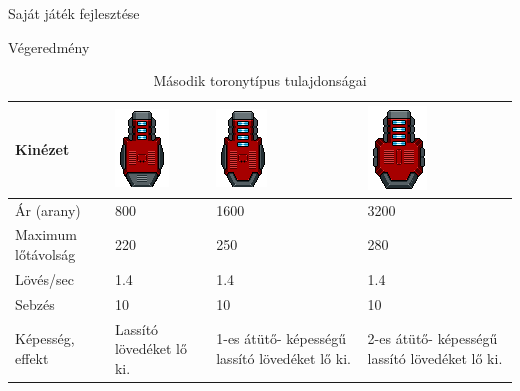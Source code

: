 \begin{MyChapter}{Saját játék fejlesztése}
\begin{MySection}{Végeredmény}
		\begin{table}[H]
			\centering
			\caption{Második toronytípus tulajdonságai}
			\label{tab:torony_tipus_1}
			\begin{tabular}{|l|C{2.85cm}|C{3.06cm}|C{3.06cm}|}
				\hline
				Kinézet & \includegraphics[scale=0.78]{kepek/jatekHasznalat/torony_11} & \includegraphics[scale=0.78]{kepek/jatekHasznalat/torony_12} & \includegraphics[scale=0.78]{kepek/jatekHasznalat/torony_13} \\ \hline
				Ár (arany) & 800 & 1600 & 3200 \\ \hline
				Maximum lőtávolság & 220 & 250 & 280 \\ \hline
				Lövés/sec & 1.4 & 1.4 & 1.4 \\ \hline
				Sebzés & 10 & 10 & 10 \\ \hline
				Képesség, effekt & Lassító lövedéket lő ki. & 1-es átütő- képességű lassító lövedéket lő ki. & 2-es átütő- képességű lassító lövedéket lő ki. \\ \hline
			\end{tabular}
		\end{table}
	

\end{MySection}
\end{MyChapter}
